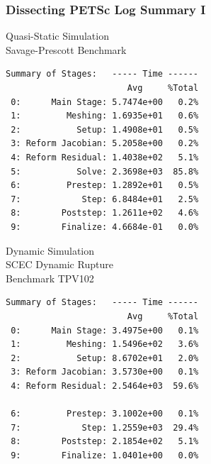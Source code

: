 \documentclass{beamer}
\begin{document}
\begin{frame}[fragile]
  \frametitle{Dissecting PETSc Log Summary I}

  \begin{minipage}[b]{5cm}
  \begin{center}
  Quasi-Static Simulation \\
  Savage-Prescott Benchmark \\
{\tiny
\begin{verbatim}
Summary of Stages:   ----- Time ------
                        Avg     %Total
 0:      Main Stage: 5.7474e+00   0.2%
 1:         Meshing: 1.6935e+01   0.6%
 2:           Setup: 1.4908e+01   0.5%
 3: Reform Jacobian: 5.2058e+00   0.2%
 4: Reform Residual: 1.4038e+02   5.1%
 5:           Solve: 2.3698e+03  85.8%
 6:         Prestep: 1.2892e+01   0.5%
 7:            Step: 6.8484e+01   2.5%
 8:        Poststep: 1.2611e+02   4.6%
 9:        Finalize: 4.6684e-01   0.0%
\end{verbatim}}
\end{center}
\end{minipage}
\hfill
  \begin{minipage}[b]{5cm}
  \begin{center}
  Dynamic Simulation\\
  SCEC Dynamic Rupture \\
  Benchmark TPV102
{\tiny
\begin{verbatim}
Summary of Stages:   ----- Time ------
                        Avg     %Total
 0:      Main Stage: 3.4975e+00   0.1%
 1:         Meshing: 1.5496e+02   3.6%
 2:           Setup: 8.6702e+01   2.0%
 3: Reform Jacobian: 3.5730e+00   0.1%
 4: Reform Residual: 2.5464e+03  59.6%

 6:         Prestep: 3.1002e+00   0.1%
 7:            Step: 1.2559e+03  29.4%
 8:        Poststep: 2.1854e+02   5.1%
 9:        Finalize: 1.0401e+00   0.0%
\end{verbatim}}
\end{center}
\end{minipage}

\end{frame}
\end{document}
